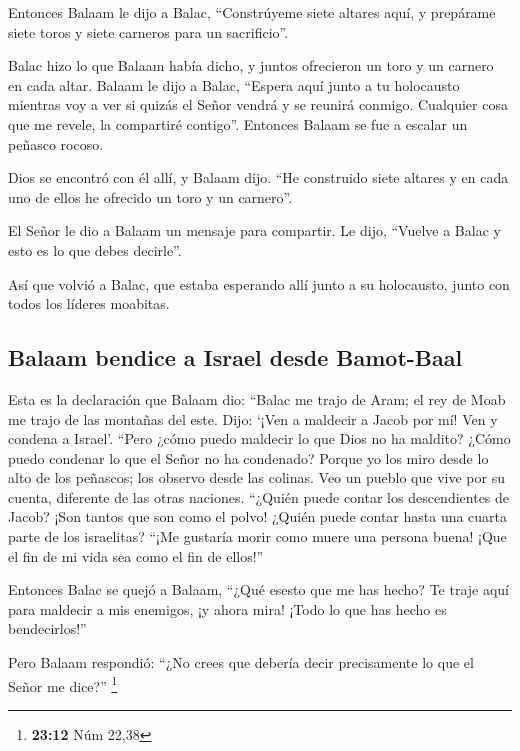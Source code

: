  Entonces Balaam le dijo a Balac, ``Constrúyeme siete
altares aquí, y prepárame siete toros y siete carneros para un
sacrificio''.

 Balac hizo lo que Balaam había dicho, y juntos ofrecieron
un toro y un carnero en cada altar.  Balaam le dijo a
Balac, ``Espera aquí junto a tu holocausto mientras voy a ver si quizás
el Señor vendrá y se reunirá conmigo. Cualquier cosa que me revele, la
compartiré contigo''. Entonces Balaam se fue a escalar un peñasco
rocoso.

 Dios se encontró con él allí, y Balaam dijo. ``He
construido siete altares y en cada uno de ellos he ofrecido un toro y un
carnero''.

 El Señor le dio a Balaam un mensaje para compartir. Le
dijo, ``Vuelve a Balac y esto es lo que debes decirle''.

 Así que volvió a Balac, que estaba esperando allí junto a
su holocausto, junto con todos los líderes moabitas.

\hypertarget{balaam-bendice-a-israel-desde-bamot-baal}{%
\subsection{Balaam bendice a Israel desde
Bamot-Baal}\label{balaam-bendice-a-israel-desde-bamot-baal}}

 Esta es la declaración que Balaam dio: ``Balac me trajo
de Aram; el rey de Moab me trajo de las montañas del este. Dijo: `¡Ven a
maldecir a Jacob por mí! Ven y condena a Israel'.  ``Pero
¿cómo puedo maldecir lo que Dios no ha maldito? ¿Cómo puedo condenar lo
que el Señor no ha condenado?  Porque yo los miro desde lo
alto de los peñascos; los observo desde las colinas. Veo un pueblo que
vive por su cuenta, diferente de las otras naciones. 
``¿Quién puede contar los descendientes de Jacob? ¡Son tantos que son
como el polvo! ¿Quién puede contar hasta una cuarta parte de los
israelitas? ``¡Me gustaría morir como muere una persona buena! ¡Que el
fin de mi vida sea como el fin de ellos!''

 Entonces Balac se quejó a Balaam, ``¿Qué esesto que me
has hecho? Te traje aquí para maldecir a mis enemigos, ¡y ahora mira!
¡Todo lo que has hecho es bendecirlos!''

 Pero Balaam respondió: ``¿No crees que debería decir
precisamente lo que el Señor me dice?'' \footnote{\textbf{23:12} Núm
  22,38}

